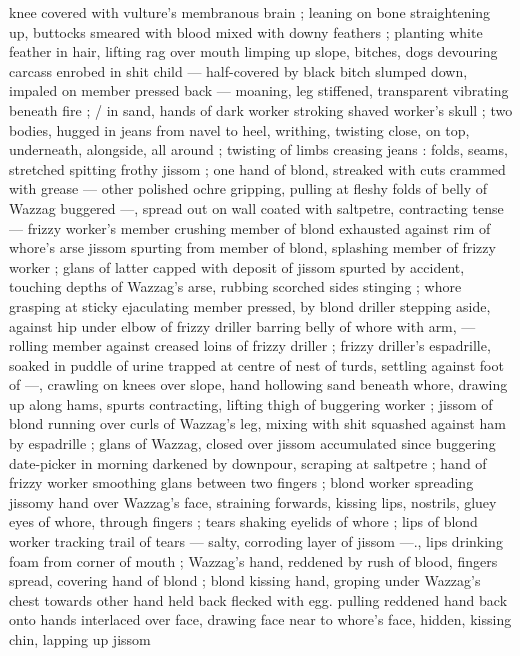 knee covered with vulture's membranous brain ; leaning on bone 
straightening up, buttocks smeared with blood mixed with downy 
feathers ; planting white feather in hair, lifting rag over mouth 
limping up slope, bitches, dogs devouring carcass enrobed in shit 
child --- half-covered by black bitch slumped down, impaled on 
member pressed back --- moaning, leg stiffened, transparent 
vibrating beneath fire ; {\slash} in sand, hands of dark worker stroking 
shaved worker's skull ; two bodies, hugged in jeans from navel to 
heel, writhing, twisting close, on top, underneath, alongside, all 
around ; twisting of limbs creasing jeans : folds, seams, stretched 
spitting frothy jissom ; one hand of blond, streaked with cuts 
crammed with grease --- other polished ochre gripping, pulling at 
fleshy folds of belly of Wazzag buggered ---, spread out on wall 
coated with saltpetre, contracting tense --- frizzy worker's member 
crushing member of blond exhausted against rim of whore's arse 
jissom spurting from member of blond, splashing member of frizzy 
worker ; glans of latter capped with deposit of jissom spurted by 
accident, touching depths of Wazzag's arse, rubbing scorched sides 
stinging ; whore grasping at sticky ejaculating member pressed, by 
blond driller stepping aside, against hip under elbow of frizzy driller 
barring belly of whore with arm, --- rolling member against creased 
loins of frizzy driller ; frizzy driller's espadrille, soaked in puddle of 
urine trapped at centre of nest of turds, settling against foot of 
---, crawling on knees over slope, hand hollowing sand beneath 
whore, drawing up along hams, spurts contracting, lifting thigh of 
buggering worker ; jissom of blond running over curls of Wazzag's 
leg, mixing with shit squashed against ham by espadrille ; glans of 
Wazzag, closed over jissom accumulated since buggering date-picker 
in morning darkened by downpour, scraping at saltpetre ; hand of 
frizzy worker smoothing glans between two fingers ; blond worker 
spreading jissomy hand over Wazzag's face, straining forwards, 
kissing lips, nostrils, gluey eyes of whore, through fingers ; tears 
shaking eyelids of whore ; lips of blond worker tracking trail of tears 
--- salty, corroding layer of jissom ---., lips drinking foam from corner 
of mouth ; Wazzag's hand, reddened by rush of blood, fingers 
spread, covering hand of blond ; blond kissing hand, groping under 
Wazzag's chest towards other hand held back flecked with egg. 
pulling reddened hand back onto hands interlaced over face, drawing 
face near to whore's face, hidden, kissing chin, lapping up jissom 
